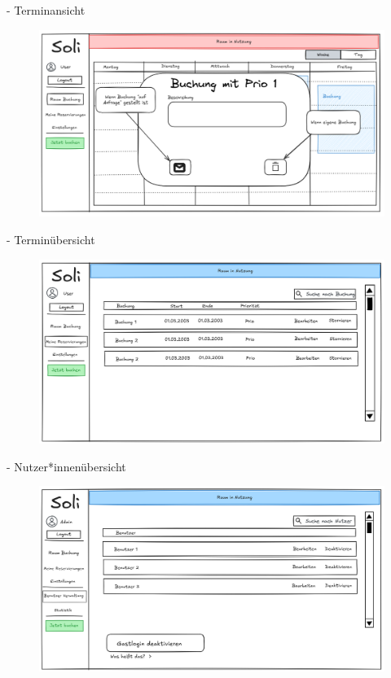 \documentclass{sdqbeamer}
\begin{document}
\begin{frame}{{\insertsubsectionhead} - Terminansicht}
    \begin{figure}
        \centering
        \includegraphics[width=0.75\linewidth]{Benutzeroberfläche/BenutzeroberflächeTerminansicht.png}
        \label{fig:enter-label}
    \end{figure}
\end{frame}

\begin{frame}{{\insertsubsectionhead} - Terminübersicht}
    \begin{figure}
        \centering
        \includegraphics[width=0.75\linewidth]{Benutzeroberfläche/BenutzeroberflächeTerminübersicht.png}
        \label{fig:enter-label}
    \end{figure}
\end{frame}

\begin{frame}{\insertsubsectionhead - Nutzer*innenübersicht}
    \begin{figure}
        \centering
        \includegraphics[width=0.75\linewidth]{Benutzeroberfläche/BenutzeroberflächeNutzerinnenansicht.png}
        \label{fig:enter-label}
    \end{figure}
\end{frame}
\end{document}
